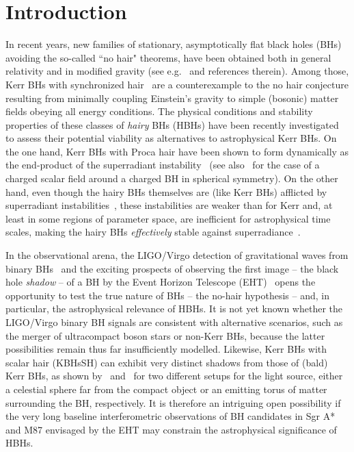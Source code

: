 \documentclass[twocolumn,aps,showpacs,showkeys,prd,superscriptaddress,byrevtex, amsmath]{revtex4-1}
\begin{document}

\section{Introduction}

In recent years, new families of stationary, asymptotically flat black holes (BHs) avoiding the so-called ``no hair" theorems, have been obtained both in general relativity and in modified gravity (see e.g.~\cite{Herdeiro:2015_review} and references therein). Among those, Kerr BHs with synchronized hair~\cite{Herdeiro:2014a,Herdeiro:2016} are a counterexample to the no hair conjecture resulting from minimally coupling Einstein's gravity to simple (bosonic) matter fields obeying all energy conditions. The physical conditions and stability properties of these classes of {\it hairy} BHs  (HBHs) have been recently investigated to assess their potential viability as  alternatives to astrophysical Kerr BHs.  On the one hand, Kerr BHs with Proca hair have been shown to form dynamically as the end-product of the superradiant instability~\cite{East:2017,Herdeiro:2017} (see also~\cite{Sanchis-Gual:2016,Bosch:2016} for the case of a charged scalar field around a charged BH in spherical  symmetry). On the other hand, even though the hairy BHs themselves are (like Kerr BHs) afflicted by superradiant instabilities~\cite{Herdeiro:2014b,Ganchev:2018}, these instabilities are weaker than for Kerr and, at least in some regions of parameter space, are inefficient for astrophysical time scales, making the hairy BHs {\it effectively} stable against superradiance~\cite{Degollado:2018}. 

In the observational arena, the LIGO/Virgo detection of gravitational waves from binary BHs~\cite{Abbott2016, Abbott:2016nmj, Abbott:2017vtc, Abbott:2017oio, Abbott:2017gyy} and the exciting prospects of observing the first image -- the black hole {\it shadow} -- of a BH by the Event Horizon Telescope (EHT)~\cite{Fish:2016} opens the opportunity to test the true nature of BHs -- the no-hair hypothesis -- and, in particular, the astrophysical relevance of HBHs. It is not yet known whether the LIGO/Virgo binary BH signals are consistent with alternative scenarios, such as the merger of ultracompact boson stars or non-Kerr BHs, because the latter possibilities remain thus far insufficiently modelled. Likewise, Kerr BHs with scalar hair (KBHsSH) can exhibit very distinct shadows from those of (bald) Kerr BHs, as shown by~\cite{Cunha:2015} and~\cite{Vincent:2016} for two different setups for the light source, either a celestial sphere far from the compact object or an emitting torus of matter surrounding the BH, respectively. It is therefore an intriguing open possibility if the very long baseline interferometric observations of BH candidates in Sgr A* and M87 envisaged by the EHT may constrain the astrophysical significance of HBHs.
\end{document}
